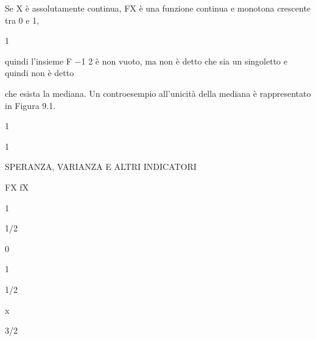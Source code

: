 \documentclass[a4paper,portrait,12pt]{article}
\begin{document}
\begin{flushleft}
Se X \`{e} assolutamente continua, FX \`{e} una funzione continua e monotona crescente tra 0 e 1,
\end{flushleft}


1


\begin{flushleft}
quindi l'insieme F $-$1 2 \`{e} non vuoto, ma non \`{e} detto che sia un singoletto e quindi non \`{e} detto
\end{flushleft}


\begin{flushleft}
che esista la mediana. Un controesempio all'unicit\`{a} della mediana \`{e} rappresentato in Figura 9.1.
\end{flushleft}


1





1










\begin{flushleft}
SPERANZA, VARIANZA E ALTRI INDICATORI
\end{flushleft}





\begin{flushleft}
FX fX
\end{flushleft}


1





1/2





0





1





1/2





\begin{flushleft}
x
\end{flushleft}





3/2
\end{document}
